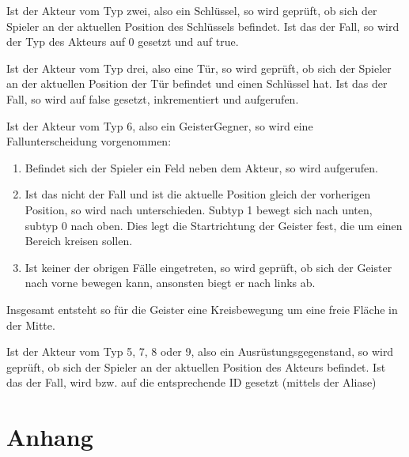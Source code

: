 \documentclass[letterpaper,10pt,ngerman]{sphinxmanual}
\begin{document}
Ist der Akteur vom Typ zwei, also ein Schlüssel, so wird geprüft, ob sich
der Spieler an der aktuellen Position des Schlüssels befindet. Ist das der
Fall, so wird der Typ des Akteurs auf 0 gesetzt und  auf true.

Ist der Akteur vom Typ drei, also eine Tür, so wird geprüft, ob sich der
Spieler an der aktuellen Position der Tür befindet und einen Schlüssel hat. Ist
das der Fall, so wird  auf false gesetzt, 
inkrementiert und  aufgerufen.

Ist der Akteur vom Typ 6, also ein Geister\sphinxhyphen{}Gegner, so wird eine
Fallunterscheidung vorgenommen:
\begin{enumerate}
%
\item {} 
Befindet sich der Spieler ein Feld neben dem Akteur, so wird
 aufgerufen.

\item {} 
Ist das nicht der Fall und ist die aktuelle Position gleich der vorherigen
Position, so wird nach  unterschieden. Subtyp 1 bewegt sich nach
unten, subtyp 0 nach oben. Dies legt die Startrichtung der Geister fest,
die um einen Bereich kreisen sollen.

\item {} 
Ist keiner der obrigen Fälle eingetreten, so wird geprüft, ob sich der Geister
nach vorne bewegen kann, ansonsten biegt er nach links ab.

\end{enumerate}

Insgesamt entsteht so für die Geister eine Kreisbewegung um eine freie Fläche
in der Mitte.

Ist der Akteur vom Typ 5, 7, 8 oder 9, also ein Ausrüstungsgegenstand, so wird
geprüft, ob sich der Spieler an der aktuellen Position des Akteurs befindet.
Ist das der Fall, wird  bzw.  auf die
entsprechende ID gesetzt (mittels der \sphinxhyphen{}Aliase)


\chapter{Anhang}
\label{\detokenize{appendix:anhang}}\label{\detokenize{appendix::doc}}
\end{document}
